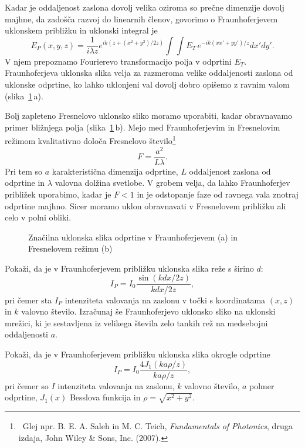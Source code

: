 Kadar je oddaljenost zaslona dovolj velika oziroma so prečne dimenzije dovolj majhne, da zadošča 
razvoj do linearnih členov, govorimo o Fraunhoferjevem uklonskem približku in uklonski integral je
\begin{equation}
\label{eq:FraunhoferApprox}
E_P(x,y,z) =  \frac{1}{i\lambda z} e^{i k (z + (x^2+y^2) /2z)}\int \int E_T\,
e^{-ik (xx'+yy')/z} dx' dy'.
\end{equation}
V njem  prepoznamo Fourierevo transformacijo polja v odprtini $E_T$.
Fraunhoferjeva uklonska slika velja za razmeroma velike oddaljenosti
zaslona od uklonske odprtine, ko lahko uklonjeni val dovolj dobro opišemo z ravnim valom
(slika~\ref{fig:UklonFF}\,a). 

Bolj zapleteno Fresnelovo uklonsko sliko moramo uporabiti, kadar obravnavamo 
primer bližnjega polja (slika~\ref{fig:UklonFF}\,b). 
Mejo med Fraunhoferjevim in Fresnelovim režimom kvalitativno določa Fresnelovo
število\footnote{~Glej npr. B. E. A. Saleh in M. C. Teich, 
{\it Fundamentals of Photonics}, druga izdaja, John Wiley \& Sons, Inc. (2007).}
\begin{equation}
F= \frac{a^2}{L\lambda}.
\label{eq:Fst}
\end{equation} 
Pri tem so $a$ karakteristična dimenzija odprtine, $L$ oddaljenost zaslona 
od odprtine in $\lambda$ valovna dolžina svetlobe. V grobem velja, da lahko 
Fraunhoferjev približek uporabimo, kadar je $F<1$ in je odstopanje faze od ravnega vala 
znotraj odprtine majhno. Sicer moramo uklon obravnavati v Fresnelovem približku ali 
celo v polni obliki. 

\begin{figure}[ht]
 \centering {} 
  
\caption{Značilna uklonska slika odprtine v Fraunhoferjevem (a) in Fresnelovem režimu (b)}
\label{fig:UklonFF}
\end{figure}

\begin{definition}
\label{naloga-Frauhofer-Kirchhoff-uklon_reza}
Pokaži, da je v Fraunhoferjevem približku uklonska slika reže s širino $d$:
\begin{equation}
I_P = I_0\frac{\sin(k d x / 2z)}{k d x/2z},
\end{equation}
pri čemer sta $I_P$ intenziteta valovanja na zaslonu v točki s 
koordinatama $(x,z)$ in $k$ valovno število. Izračunaj še Fraunhoferjevo uklonsko sliko
na uklonski mrežici, ki je sestavljena iz velikega števila zelo tankih rež na medsebojni 
oddaljenosti $a$.
\end{definition}
\begin{definition}
\label{naloga-Frauhofer-Kirchhoff-uklon}
Pokaži, da je v Fraunhoferjevem približku uklonska slika okrogle odprtine
\begin{equation}
I_P = I_0\frac{4 J_1(k a \rho/ z)}{k a \rho/z},
\end{equation}
pri čemer so $I$ intenziteta valovanja na zaslonu, $k$ valovno število, $a$ polmer odprtine, 
$J_1(x)$ Besslova funkcija in $\rho = \sqrt{x^2+y^2}$.
\end{definition}

